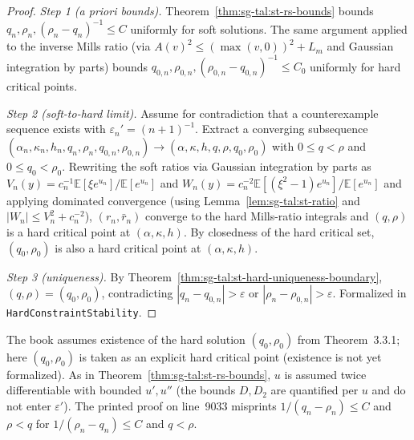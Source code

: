 \begin{proof}
  \leanok
\emph{Step 1 (a priori bounds).} Theorem~\ref{thm:sg-tal:st-rs-bounds} bounds $q_n,\rho_n,(\rho_n-q_n)^{-1}\le C$
uniformly for soft solutions. The same argument applied to the inverse Mills ratio (via
$A(v)^2\le(\max(v,0))^2+L_m$ and Gaussian integration by parts) bounds $q_{0,n},\rho_{0,n},(\rho_{0,n}-q_{0,n})^{-1}\le C_0$
uniformly for hard critical points.

\emph{Step 2 (soft-to-hard limit).} Assume for contradiction that a counterexample sequence exists with
$\varepsilon_n'=(n+1)^{-1}$. Extract a converging subsequence
$(\alpha_n,\kappa_n,h_n,q_n,\rho_n,q_{0,n},\rho_{0,n})\to(\alpha,\kappa,h,q,\rho,q_0,\rho_0)$ with
$0\le q<\rho$ and $0\le q_0<\rho_0$. Rewriting the soft ratios via Gaussian integration by parts as
$V_n(y)=c_n^{-1}\mathbb E[\xi e^{u_n}]/\mathbb E[e^{u_n}]$ and
$W_n(y)=c_n^{-2}\mathbb E[(\xi^2-1)e^{u_n}]/\mathbb E[e^{u_n}]$ and applying dominated convergence
(using Lemma~\ref{lem:sg-tal:st-ratio} and $|W_n|\le V_n^2+c_n^{-2}$), $(r_n,\bar r_n)$ converge to the
hard Mills-ratio integrals and $(q,\rho)$ is a hard critical point at $(\alpha,\kappa,h)$. By closedness
of the hard critical set, $(q_0,\rho_0)$ is also a hard critical point at $(\alpha,\kappa,h)$.

\emph{Step 3 (uniqueness).} By Theorem~\ref{thm:sg-tal:st-hard-uniqueness-boundary}, $(q,\rho)=(q_0,\rho_0)$,
contradicting $|q_n-q_{0,n}|>\varepsilon$ or $|\rho_n-\rho_{0,n}|>\varepsilon$.
Formalized in \texttt{HardConstraintStability}.
\end{proof}

\begin{remark}\label{rem:sg-tal:st-cor-334}
The book assumes existence of the hard solution $(q_0,\rho_0)$ from Theorem~3.3.1; here $(q_0,\rho_0)$ is
taken as an explicit hard critical point (existence is not yet formalized). As in
Theorem~\ref{thm:sg-tal:st-rs-bounds}, $u$ is assumed twice differentiable with bounded $u',u''$ (the
bounds $D,D_2$ are quantified per $u$ and do not enter $\varepsilon'$). The printed proof on line~9033
misprints $1/(q_n-\rho_n)\le C$ and $\rho<q$ for $1/(\rho_n-q_n)\le C$ and $q<\rho$.
\end{remark}
